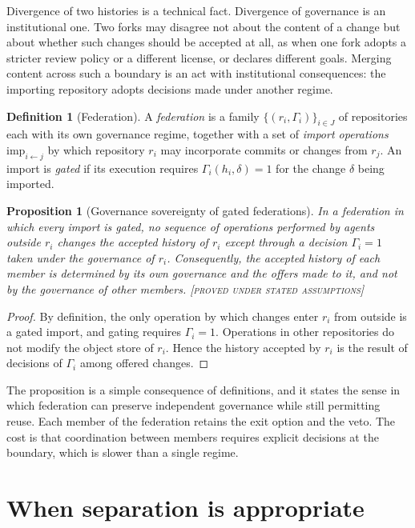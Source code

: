 \documentclass[11pt,twoside,openright]{book}
\theoremstyle{plain}
\newtheorem{proposition}[theorem]{Proposition}
\theoremstyle{definition}
\newtheorem{definition}[theorem]{Definition}
\theoremstyle{remark}
\newcommand{\Proved}{\textup{\textsc{[proved under stated assumptions]}}}
\begin{document}
Divergence of two histories is a technical fact. Divergence of governance is an institutional one. Two forks may disagree not about the content of a change but about whether such changes should be accepted at all, as when one fork adopts a stricter review policy or a different license, or declares different goals. Merging content across such a boundary is an act with institutional consequences: the importing repository adopts decisions made under another regime.

\begin{definition}[Federation]\label{def:federation}
A \emph{federation} is a family $\{(r_i,\Gamma_i)\}_{i\in J}$ of repositories each with its own governance regime, together with a set of \emph{import operations} $\mathrm{imp}_{i\leftarrow j}$ by which repository $r_i$ may incorporate commits or changes from $r_j$. An import is \emph{gated} if its execution requires $\Gamma_i(h_i,\delta)=1$ for the change $\delta$ being imported.
\end{definition}

\begin{proposition}[Governance sovereignty of gated federations]\label{prop:sovereignty}
In a federation in which every import is gated, no sequence of operations performed by agents outside $r_i$ changes the accepted history of $r_i$ except through a decision $\Gamma_i=1$ taken under the governance of $r_i$. Consequently, the accepted history of each member is determined by its own governance and the offers made to it, and not by the governance of other members.
\Proved{}
\end{proposition}

\begin{proof}
By definition, the only operation by which changes enter $r_i$ from outside is a gated import, and gating requires $\Gamma_i=1$. Operations in other repositories do not modify the object store of $r_i$. Hence the history accepted by $r_i$ is the result of decisions of $\Gamma_i$ among offered changes.
\end{proof}

The proposition is a simple consequence of definitions, and it states the sense in which federation can preserve independent governance while still permitting reuse. Each member of the federation retains the exit option and the veto. The cost is that coordination between members requires explicit decisions at the boundary, which is slower than a single regime.

\section{When separation is appropriate}
\end{document}
